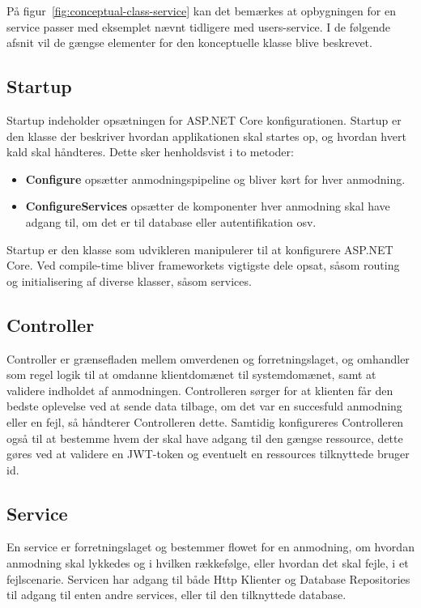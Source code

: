 På figur~\ref{fig:conceptual-class-service} kan det bemærkes at opbygningen for en service passer med eksemplet nævnt tidligere med users-service. I de følgende afsnit vil de gængse elementer for den konceptuelle klasse blive beskrevet.

\subsection{Startup}

Startup indeholder opsætningen for ASP.NET Core konfigurationen. Startup er den klasse der beskriver hvordan applikationen skal startes op, og hvordan hvert kald skal håndteres. Dette sker henholdsvist i to metoder:

\begin{itemize}
  \item \textbf{Configure}  opsætter anmodningspipeline og bliver kørt for hver anmodning.
  \item \textbf{ConfigureServices} opsætter de komponenter hver anmodning skal have adgang til, om det er til database eller autentifikation osv.
\end{itemize}

Startup er den klasse som udvikleren manipulerer til at konfigurere ASP.NET Core. Ved compile-time bliver frameworkets vigtigste dele opsat, såsom routing og initialisering af diverse klasser, såsom services.

\subsection{Controller}

Controller er grænsefladen mellem omverdenen og forretningslaget, og omhandler som regel logik til at omdanne klientdomænet til systemdomænet, samt at validere indholdet af anmodningen. Controlleren sørger for at klienten får den bedste oplevelse ved at sende data tilbage, om det var en succesfuld anmodning eller en fejl, så håndterer Controlleren dette. Samtidig konfigureres Controlleren også til at bestemme hvem der skal have adgang til den gængse ressource, dette gøres ved at validere en JWT-token og eventuelt en ressources tilknyttede bruger id.

\subsection{Service}

En service er forretningslaget og bestemmer flowet for en anmodning, om hvordan anmodning skal lykkedes og i hvilken rækkefølge, eller hvordan det skal fejle, i et fejlscenarie. Servicen har adgang til både Http Klienter og Database Repositories til adgang til enten andre services, eller til den tilknyttede database.

